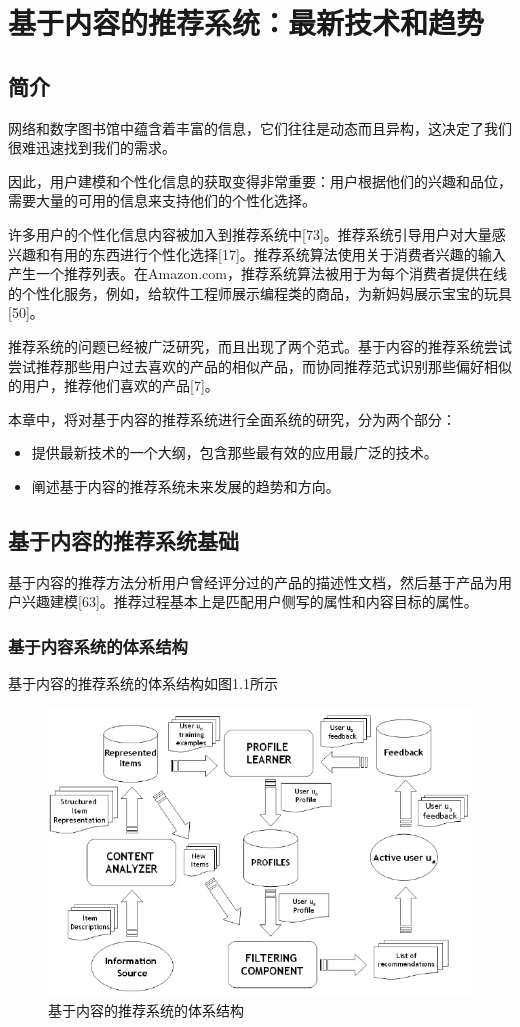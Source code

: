 \chapter{基于内容的推荐系统：最新技术和趋势}

\section{简介}
网络和数字图书馆中蕴含着丰富的信息，它们往往是动态而且异构，这决定了我们很难迅速找到我们的需求。

因此，用户建模和个性化信息的获取变得非常重要：用户根据他们的兴趣和品位，需要大量的可用的信息来支持他们的个性化选择。

许多用户的个性化信息内容被加入到推荐系统中[73]。推荐系统引导用户对大量感兴趣和有用的东西进行个性化选择[17]。推荐系统算法使用关于消费者兴趣的输入产生一个推荐列表。在Amazon.com，推荐系统算法被用于为每个消费者提供在线的个性化服务，例如，给软件工程师展示编程类的商品，为新妈妈展示宝宝的玩具[50]。

推荐系统的问题已经被广泛研究，而且出现了两个范式。基于内容的推荐系统尝试尝试推荐那些用户过去喜欢的产品的相似产品，而协同推荐范式识别那些偏好相似的用户，推荐他们喜欢的产品[7]。

本章中，将对基于内容的推荐系统进行全面系统的研究，分为两个部分：
\begin{itemize}
	\item 提供最新技术的一个大纲，包含那些最有效的应用最广泛的技术。
	\item 阐述基于内容的推荐系统未来发展的趋势和方向。
\end{itemize}

\section{基于内容的推荐系统基础}
基于内容的推荐方法分析用户曾经评分过的产品的描述性文档，然后基于产品为用户兴趣建模[63]。推荐过程基本上是匹配用户侧写的属性和内容目标的属性。

\subsection{基于内容系统的体系结构}
基于内容的推荐系统的体系结构如图1.1所示
\begin{figure}[!htb]
	\centering
	\includegraphics[scale=0.5]{figure/f3.1.jpg}
	\caption{基于内容的推荐系统的体系结构}
\end{figure}

